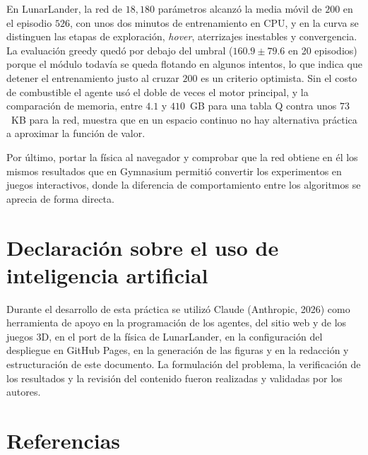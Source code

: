 \documentclass[11pt]{article}
\begin{document}
En LunarLander, la red de $18{,}180$ parámetros alcanzó la media móvil de $200$
en el episodio $526$, con unos dos minutos de entrenamiento en CPU, y en la
curva se distinguen las etapas de exploración, \emph{hover}, aterrizajes
inestables y convergencia. La evaluación greedy quedó por debajo del umbral
($160.9 \pm 79.6$ en 20 episodios) porque el módulo todavía se queda flotando en
algunos intentos, lo que indica que detener el entrenamiento justo al cruzar
$200$ es un criterio optimista. Sin el costo de combustible el agente usó el
doble de veces el motor principal, y la comparación de memoria, entre $4.1$ y
$410$~GB para una tabla Q contra unos $73$~KB para la red, muestra que en un
espacio continuo no hay alternativa práctica a aproximar la función de valor.

Por último, portar la física al navegador y comprobar que la red obtiene en él
los mismos resultados que en Gymnasium permitió convertir los experimentos en
juegos interactivos, donde la diferencia de comportamiento entre los algoritmos
se aprecia de forma directa.

\section*{Declaración sobre el uso de inteligencia artificial}

Durante el desarrollo de esta práctica se utilizó Claude (Anthropic, 2026) como
herramienta de apoyo en la programación de los agentes, del sitio web y de los
juegos 3D, en el port de la física de LunarLander, en la configuración del
despliegue en GitHub Pages, en la generación de las figuras y en la redacción y
estructuración de este documento. La formulación del problema, la verificación
de los resultados y la revisión del contenido fueron realizadas y validadas por
los autores.

\section{Referencias}
\end{document}
